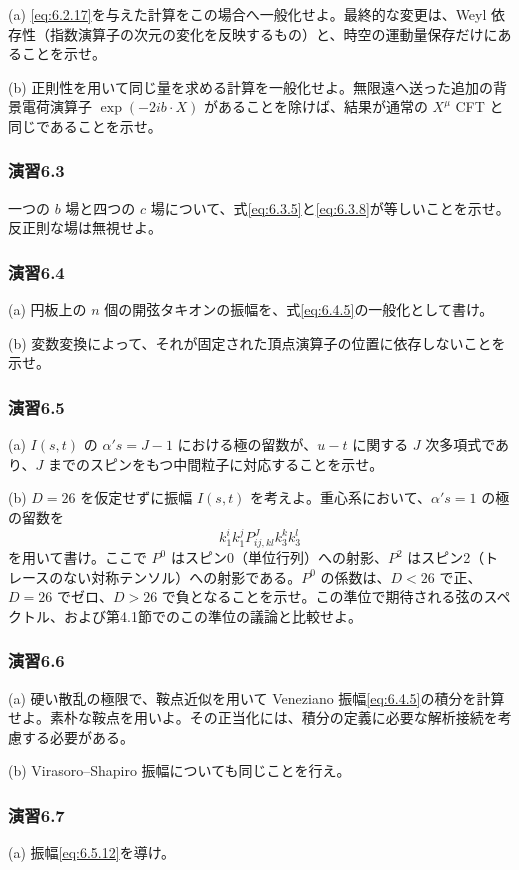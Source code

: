 (a) \eqref{eq:6.2.17}を与えた計算をこの場合へ一般化せよ。最終的な変更は、Weyl 依存性（指数演算子の次元の変化を反映するもの）と、時空の運動量保存だけにあることを示せ。

(b) 正則性を用いて同じ量を求める計算を一般化せよ。無限遠へ送った追加の背景電荷演算子 $\exp(-2ib\cdot X)$ があることを除けば、結果が通常の $X^\mu$ CFT と同じであることを示せ。

\subsubsection*{演習6.3}\label{ex:6.3}
一つの $b$ 場と四つの $c$ 場について、式\eqref{eq:6.3.5}と\eqref{eq:6.3.8}が等しいことを示せ。反正則な場は無視せよ。

\subsubsection*{演習6.4}\label{ex:6.4}
(a) 円板上の $n$ 個の開弦タキオンの振幅を、式\eqref{eq:6.4.5}の一般化として書け。

(b) 変数変換によって、それが固定された頂点演算子の位置に依存しないことを示せ。

\subsubsection*{演習6.5}\label{ex:6.5}
(a) $I(s,t)$ の $\alpha's=J-1$ における極の留数が、$u-t$ に関する $J$ 次多項式であり、$J$ までのスピンをもつ中間粒子に対応することを示せ。

(b) $D=26$ を仮定せずに振幅 $I(s,t)$ を考えよ。重心系において、$\alpha's=1$ の極の留数を
\[
k_1^ik_1^jP^J_{ij,kl}k_3^kk_3^l
\]
を用いて書け。ここで $P^0$ はスピン0（単位行列）への射影、$P^2$ はスピン2（トレースのない対称テンソル）への射影である。$P^0$ の係数は、$D<26$ で正、$D=26$ でゼロ、$D>26$ で負となることを示せ。この準位で期待される弦のスペクトル、および第4.1節でのこの準位の議論と比較せよ。

\subsubsection*{演習6.6}\label{ex:6.6}
(a) 硬い散乱の極限で、鞍点近似を用いて Veneziano 振幅\eqref{eq:6.4.5}の積分を計算せよ。素朴な鞍点を用いよ。その正当化には、積分の定義に必要な解析接続を考慮する必要がある。

(b) Virasoro--Shapiro 振幅についても同じことを行え。

\subsubsection*{演習6.7}\label{ex:6.7}
(a) 振幅\eqref{eq:6.5.12}を導け。

